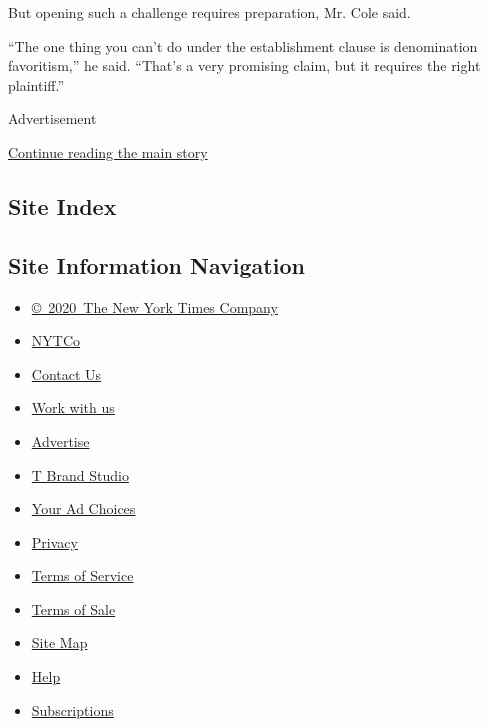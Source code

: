But opening such a challenge requires preparation, Mr. Cole said.

``The one thing you can't do under the establishment clause is
denomination favoritism,'' he said. ``That's a very promising claim, but
it requires the right plaintiff.''

Advertisement

\protect\hyperlink{after-bottom}{Continue reading the main story}

\hypertarget{site-index}{%
\subsection{Site Index}\label{site-index}}

\hypertarget{site-information-navigation}{%
\subsection{Site Information
Navigation}\label{site-information-navigation}}

\begin{itemize}
\tightlist
\item
  \href{https://help.nytimes3xbfgragh.onion/hc/en-us/articles/115014792127-Copyright-notice}{©~2020~The
  New York Times Company}
\end{itemize}

\begin{itemize}
\tightlist
\item
  \href{https://www.nytco.com/}{NYTCo}
\item
  \href{https://help.nytimes3xbfgragh.onion/hc/en-us/articles/115015385887-Contact-Us}{Contact
  Us}
\item
  \href{https://www.nytco.com/careers/}{Work with us}
\item
  \href{https://nytmediakit.com/}{Advertise}
\item
  \href{http://www.tbrandstudio.com/}{T Brand Studio}
\item
  \href{https://www.nytimes3xbfgragh.onion/privacy/cookie-policy\#how-do-i-manage-trackers}{Your
  Ad Choices}
\item
  \href{https://www.nytimes3xbfgragh.onion/privacy}{Privacy}
\item
  \href{https://help.nytimes3xbfgragh.onion/hc/en-us/articles/115014893428-Terms-of-service}{Terms
  of Service}
\item
  \href{https://help.nytimes3xbfgragh.onion/hc/en-us/articles/115014893968-Terms-of-sale}{Terms
  of Sale}
\item
  \href{https://spiderbites.nytimes3xbfgragh.onion}{Site Map}
\item
  \href{https://help.nytimes3xbfgragh.onion/hc/en-us}{Help}
\item
  \href{https://www.nytimes3xbfgragh.onion/subscription?campaignId=37WXW}{Subscriptions}
\end{itemize}
